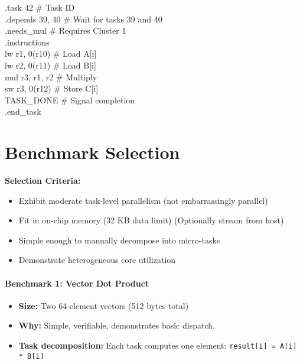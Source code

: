 \documentclass[a4paper,12pt]{article}
\begin{document}
\begin{tcolorbox}[
  colback=lightgray!50,
  colframe=darkgray,
  arc=1mm,
  boxrule=0.5pt,
  left=5pt,
  right=5pt,
  top=5pt,
  bottom=5pt,
  fontupper=\ttfamily\footnotesize
]
.task 42 \# Task ID\\
.depends 39, 40 \# Wait for tasks 39 and 40\\
.needs\_mul \# Requires Cluster 1\\
.instructions\\
\hspace{1em}lw   r1, 0(r10)  \# Load A[i]\\
\hspace{1em}lw   r2, 0(r11)  \# Load B[i]\\
\hspace{1em}mul  r3, r1, r2  \# Multiply\\
\hspace{1em}sw   r3, 0(r12)  \# Store C[i]\\
\hspace{1em}TASK\_DONE       \# Signal completion\\
.end\_task
\end{tcolorbox}

\section*{Benchmark Selection}

\begin{tcolorbox}[
  colback=lightblue!20,
  colframe=accentblue,
  arc=2mm,
  boxrule=1pt,
  left=8pt,
  right=8pt,
  top=8pt,
  bottom=8pt,
  breakable
]
\textbf{Selection Criteria:}
\begin{itemize}
    \item Exhibit moderate task-level parallelism (not embarrassingly parallel)
    \item Fit in on-chip memory (32 KB data limit) (Optionally stream from host)
    \item Simple enough to manually decompose into micro-tasks
    \item Demonstrate heterogeneous core utilization
\end{itemize}
\end{tcolorbox}

\paragraph{Benchmark 1: Vector Dot Product}
\begin{itemize}
    \item \textbf{Size:} Two 64-element vectors (512 bytes total)
    \item \textbf{Why:} Simple, verifiable, demonstrates basic dispatch.
    \item \textbf{Task decomposition:} Each task computes one element: \texttt{result[i] = A[i] * B[i]}
\end{itemize}
\end{document}
